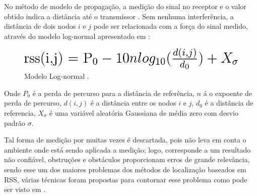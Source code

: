 	No método de modelo de propagação, a medição do sinal no receptor e o valor
obtido indica a distância até o transmissor \cite{rss1}. Sem nenhuma interferência, a distância de dois nodos $i$ e $j$ pode ser 
relacionada com a força do sinal medido, através do modelo log-normal apresentado em \cite{rss2}:

	\begin{figure}[hb]
	\centering
	\includegraphics[scale=0.4]{images/CodeCogsEqn.png}
	\caption{Modelo Log-normal \cite{rss2}.}
	\label{fig:rssDist}
	\end{figure}
	
	Onde $P_0$ é a perda de percurso para a distância de referência,
$n$ á o expoente de perda de percurso, $d(i,j)$ é a distância entre os nodos $i$ e $j$,
$d_0$ é a distância de referencia, $X_\sigma$ é uma variável aleatória Gaussiana de média zero com desvio padrão $\sigma$.

Tal forma de medição por muitas vezes é
descartada, pois não leva em conta o ambiente onde está sendo aplicada a medição; logo,
corresponde a um resultado não confiável, obstruções e obstáculos proporcionam erros de grande relevância, 
sendo esse um dos maiores problemas dos métodos de localização baseados em RSS, várias técnicas foram propostas para 
contornar esse problema como pode ser visto em \cite{wifiRadar}\cite{rss1}\cite{wsnsLinear}\cite{multAgent} \cite{rss2}.

